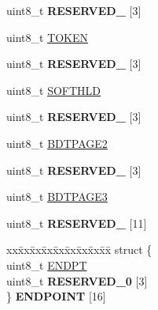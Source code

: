 \begin{DoxyCompactItemize}
uint8\+\_\+t {\bfseries R\+E\+S\+E\+R\+V\+E\+D\+\_} \mbox{[}3\mbox{]}
\item 
uint8\+\_\+t \hyperlink{struct_u_s_b___mem_map_a8806f493a96bf80f94a1b04fd5a595a7}{T\+O\+K\+EN}
\item 
\mbox{\label{struct_u_s_b___mem_map_af1b3dbe2aa5bd0b752abbdf9c29d70b6}} 
uint8\+\_\+t {\bfseries R\+E\+S\+E\+R\+V\+E\+D\+\_} \mbox{[}3\mbox{]}
\item 
uint8\+\_\+t \hyperlink{struct_u_s_b___mem_map_a5462ecd3a3fe1425826815c78bfb8120}{S\+O\+F\+T\+H\+LD}
\item 
\mbox{\label{struct_u_s_b___mem_map_ae58f8f823509af251c9145ef32f35c82}} 
uint8\+\_\+t {\bfseries R\+E\+S\+E\+R\+V\+E\+D\+\_} \mbox{[}3\mbox{]}
\item 
uint8\+\_\+t \hyperlink{struct_u_s_b___mem_map_abb9113fced941f9af402d501dd6dc301}{B\+D\+T\+P\+A\+G\+E2}
\item 
\mbox{\label{struct_u_s_b___mem_map_a443f87251df6c05ff456e604ca853052}} 
uint8\+\_\+t {\bfseries R\+E\+S\+E\+R\+V\+E\+D\+\_} \mbox{[}3\mbox{]}
\item 
uint8\+\_\+t \hyperlink{struct_u_s_b___mem_map_afd1f5b8867e36b32297641c5fe0b283b}{B\+D\+T\+P\+A\+G\+E3}
\item 
\mbox{\label{struct_u_s_b___mem_map_a3fd06de5424ba76a2ad43d024b8602cd}} 
uint8\+\_\+t {\bfseries R\+E\+S\+E\+R\+V\+E\+D\+\_} \mbox{[}11\mbox{]}
\item 
\mbox{\label{struct_u_s_b___mem_map_a9bffd97483e5bce748122e57d913794f}} 
\begin{tabbing}
xx\=xx\=xx\=xx\=xx\=xx\=xx\=xx\=xx\=\kill
struct \{\\
\>uint8\_t \hyperlink{struct_u_s_b___mem_map_a86aaba02227a45a333f72565b0bec378}{ENDPT}\\
\>uint8\_t {\bfseries RESERVED\_0} \mbox{[}3\mbox{]}\\
\} {\bfseries ENDPOINT} \mbox{[}16\mbox{]}\\


\end{tabbing}
\end{DoxyCompactItemize}
